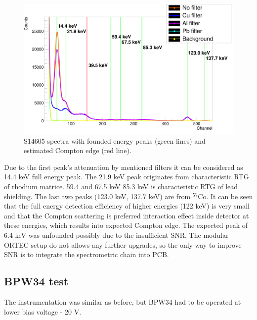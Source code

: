 \begin{figure}[H]
 \centering
 \includegraphics[scale=0.125, angle = 0]{./pictures/S14GammaTest.png}
 \caption{S14605 spectra with founded energy peaks (green lines) and estimated Compton edge (red line).}
 \label{S14605 spectra}
 
\end{figure}


\par

Due to the first peak's attenuation by mentioned filters it can be considered as 14.4 keV full energy peak. The 21.9 keV peak originates from characteristic RTG of rhodium matrice. 59.4 and 67.5 keV 85.3 keV is characteristic RTG of lead shielding. The last two peaks (123.0 keV, 137.7 keV) are from $^{57}$Co. It can be seen that the full energy detection efficiency of higher energies (122 keV) is very small and that the Compton scattering is preferred interaction effect inside detector at these energies, which results into expected Compton edge. The expected peak of 6.4 keV was unfounded possibly due to the insufficient SNR. The modular ORTEC setup do not allows any further upgrades, so the only way to improve SNR is to integrate the spectrometric chain into PCB. 

\subsection{BPW34 test}
The instrumentation was similar as before, but BPW34 had to be operated at lower bias voltage - 20 V.

